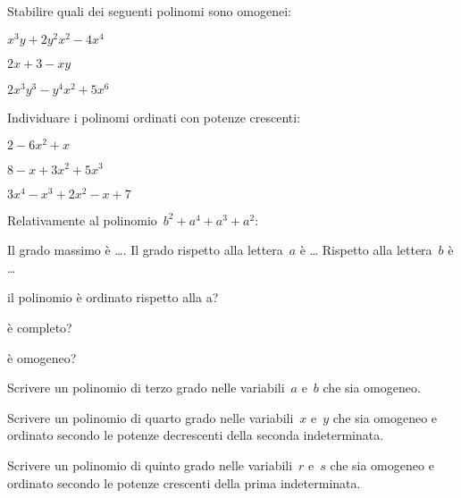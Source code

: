 \begin{multicols}{2}
\begin{esercizio}
\label{ese:10.3}
Stabilire quali dei seguenti polinomi sono omogenei:

\begin{enumeratea}
\item \(x^3y+2y^2x^2-4x^4\)
\item \(2x+3-xy\)
\item \(2x^3y^3-y^4x^2+5x^6\)
\end{enumeratea}
\end{esercizio}

\begin{esercizio}
\label{ese:10.4}
Individuare i polinomi ordinati con potenze crescenti:

\begin{enumeratea}
\item \(2-6x^2+x\)
\item \(8-x+3x^2+5x^3\)
\item \(3x^4-x^3+2x^2-x+7\)
\end{enumeratea}
\end{esercizio}

\begin{esercizio}
\label{ese:10.5}
Relativamente al polinomio~\(b^2+a^4+a^3+a^2\):
\begin{itemize*}
\item Il grado massimo è \ldots. Il grado rispetto alla lettera~\(a\) è \ldots 
Rispetto alla lettera~\(b\) è \ldots
\item il polinomio è ordinato rispetto alla a? %
\item è completo? %
\item è omogeneo? %
\end{itemize*}
\end{esercizio}

\begin{esercizio}
\label{ese:10.6}
Scrivere un polinomio di terzo grado nelle variabili~\(a\) e~\(b\) che sia omogeneo.
\end{esercizio}

\begin{esercizio}
\label{ese:10.7}
Scrivere un polinomio di quarto grado nelle variabili~\(x\) e~\(y\) che sia omogeneo 
e ordinato secondo le
potenze decrescenti della seconda indeterminata.
\end{esercizio}

\begin{esercizio}
\label{ese:10.8}
Scrivere un polinomio di quinto grado nelle variabili~\(r\) e~\(s\) che sia omogeneo 
e ordinato secondo le
potenze crescenti della prima indeterminata.
\end{esercizio}


\end{multicols}
